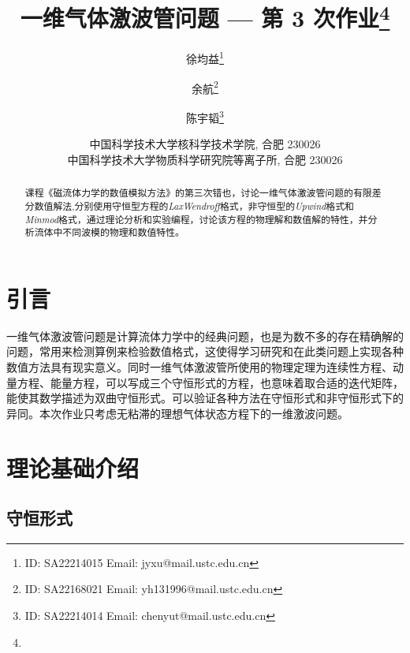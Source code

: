\documentclass[10.5pt
]{article}
\title{一维气体激波管问题 --- 第 3 次作业\footnote{\Term\Course}}
\author{徐均益\footnote{ID: SA22214015 Email: jyxu@mail.ustc.edu.cn}
  \and
  余航\footnote{ID: SA22168021 Email: yh131996@mail.ustc.edu.cn}
  \and
  陈宇韬\footnote{ID: SA22214014 Email: chenyut@mail.ustc.edu.cn}
}
\date{%
\scriptsize%
中国科学技术大学核科学技术学院, 合肥 230026 \\
中国科学技术大学物质科学研究院等离子所, 合肥 230026
%
}
\begin{document}
\maketitle

\begin{abstract}
课程《磁流体力学的数值模拟方法》的第三次错也，讨论一维气体激波管问题的有限差分数值解法,分别使用守恒型方程的\textit{LaxWendroff}格式，非守恒型的\textit{Upwind}格式和\textit{Minmod}格式，通过理论分析和实验编程，讨论该方程的物理解和数值解的特性，并分析流体中不同波模的物理和数值特性。 

\end{abstract}

\section{引言}
一维气体激波管问题是计算流体力学中的经典问题，也是为数不多的存在精确解的问题，常用来检测算例来检验数值格式，这使得学习研究和在此类问题上实现各种数值方法具有现实意义。同时一维气体激波管所使用的物理定理为连续性方程、动量方程、能量方程，可以写成三个守恒形式的方程，也意味着取合适的迭代矩阵，能使其数学描述为双曲守恒形式。可以验证各种方法在守恒形式和非守恒形式下的异同。本次作业只考虑无粘滞的理想气体状态方程下的一维激波问题。

\section{理论基础介绍}
\subsection{守恒形式}
\end{document}
